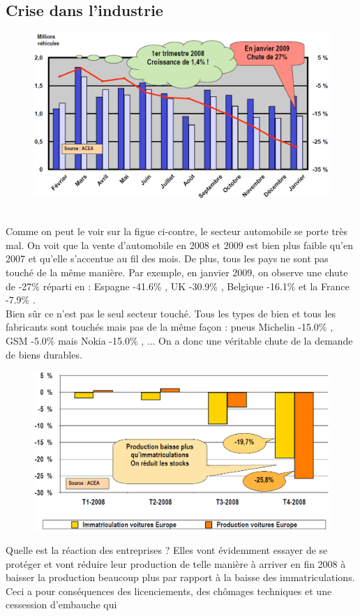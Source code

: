 \subsection{Crise dans l'industrie}

\begin{figure}
\includegraphics[scale=0.3]{16}
\end{figure}
\ \\ Comme on peut le voir sur la figue ci-contre, le secteur automobile se porte très mal. On voit que la vente d'automobile en 2008 et 2009 est bien plus faible qu'en 2007 et qu'elle s'accentue au fil des mois. De plus, tous les pays ne sont pas touché de la même manière. Par exemple, en janvier 2009, on observe une chute de -27\% réparti en : Espagne -41.6\% , UK -30.9\% , Belgique -16.1\% et la France -7.9\% .\\
Bien sûr ce n'est pas le seul secteur touché. Tous les types de bien et tous les fabricants sont touchés mais pas de la même façon : pneus Michelin -15.0\% , GSM -5.0\% mais Nokia -15.0\% , ... On a donc une véritable chute de la demande de biens durables. 

\begin{figure}
\includegraphics[scale=0.3]{17}
\end{figure}
Quelle est la réaction des entreprises ? Elles vont évidemment essayer de se protéger et vont réduire leur production de telle manière à arriver en fin 2008 à baisser la production beaucoup plus par rapport à la baisse des immatriculations. Ceci a pour conséquences des licenciements, des chômages techniques et une cessession d'embauche qui 

